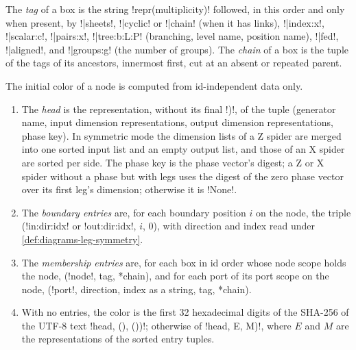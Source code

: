 \begin{definition}\label{def:diagrams-box-tag}
The \emph{tag} of a box is the string \py!repr(multiplicity)! followed, in this order and only when present, by \code!|sheets!, \code!|cyclic! or \code!|chain! (when it has links), \code!|index:x!, \code!|scalar:c!, \code!|pairs:x!, \code!|tree:b:L:P! (branching, level name, position name), \code!|fed!, \code!|aligned!, and \code!|groups:g! (the number of groups). The \emph{chain} of a box is the tuple of the tags of its ancestors, innermost first, cut at an absent or repeated parent.
\end{definition}

\begin{definition}\label{def:diagrams-initial-colour}
The initial color of a node is computed from id-independent data only.
\begin{enumerate}
\item The \emph{head} is the representation, without its final \code!)!, of the tuple (generator name, input dimension representations, output dimension representations, phase key). In symmetric mode the dimension lists of a Z spider are merged into one sorted input list and an empty output list, and those of an X spider are sorted per side. The phase key is the phase vector's digest; a Z or X spider without a phase but with legs uses the digest of the zero phase vector over its first leg's dimension; otherwise it is \code!None!.
\item The \emph{boundary entries} are, for each boundary position $i$ on the node, the triple (\code!in:dir:idx! or \code!out:dir:idx!, $i$, $0$), with direction and index read under \cref{def:diagrams-leg-symmetry}.
\item The \emph{membership entries} are, for each box in id order whose node scope holds the node, (\code!node!, tag, *chain), and for each port of its port scope on the node, (\code!port!, direction, index as a string, tag, *chain).
\item With no entries, the color is the first 32 hexadecimal digits of the SHA-256 of the UTF-8 text \code!{head}, (), ())!; otherwise of \code!{head}, {E}, {M})!, where $E$ and $M$ are the representations of the sorted entry tuples.
\end{enumerate}
\end{definition}

